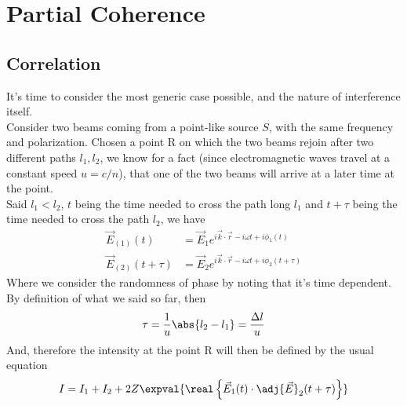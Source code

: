 \documentclass[../electromagnetism.tex]{subfiles}
\begin{document}
\section{Partial Coherence}
\subsection{Correlation}
It's time to consider the most generic case possible, and the nature of interference itself.\\
Consider two beams coming from a point-like source $S$, with the same frequency and polarization. Chosen a point R on which the two beams rejoin after two different paths $l_1, l_2$, we know for a fact (since electromagnetic waves travel at a constant speed $u=c/n$), that one of the two beams will arrive at a later time at the point.\\
Said $l_1<l_2$, $t$ being the time needed to cross the path long $l_1$ and $t+\tau$ being the time needed to cross the path $l_2$, we have
\begin{equation}
	\begin{aligned}
		\vec{E}_{(1)}(t)&= \vec{E}_1e^{i\vec{k}\cdot\vec{r}-i\omega t+i\phi_1(t)}\\
		\vec{E}_{(2)}(t+\tau)&= \vec{E}_2e^{i\vec{k}\cdot\vec{r}-i\omega t+i\phi_2(t+\tau)}
	\end{aligned}
	\label{eq:pcorre1e2.pcorr}
\end{equation}
Where we consider the randomness of phase by noting that it's time dependent.\\
By definition of what we said so far, then 
\begin{equation}
	\tau=\frac{1}{u}\abs{l_2-l_1}=\frac{\Delta l}{u}
	\label{eq:taudef.pcorr}
\end{equation}
And, therefore the intensity at the point R will then be defined by the usual equation
\begin{equation*}
	I=I_1+I_2+2Z\expval{\real\left\{ \vec{E}_1(t)\cdot\adj{\vec{E}}_2(t+\tau) \right\}}
\end{equation*}
\end{document}

